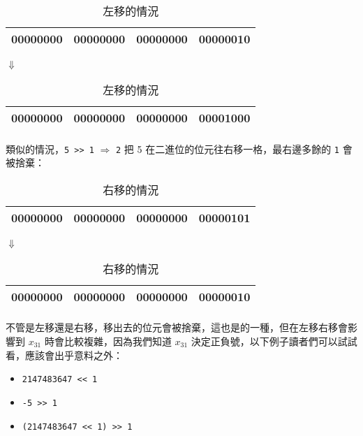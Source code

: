 \documentclass[12pt,a4paper,oneside]{report}
\begin{document}
\begin{CJK}{UTF8}{bkai}
\begin{table}[h!]
\centering
\begin{tabular}{|c|c|c|c|}
\hline
00000000 & 00000000 & 00000000 & 000000{\color{red}10}\\
\hline
\end{tabular}
\begin{center}$\Downarrow$\end{center}
\begin{tabular}{|c|c|c|c|}
\hline
00000000 & 00000000 & 00000000 & 0000{\color{red}10}00\\
\hline
\end{tabular}
\caption{左移的情況}
\label{basic:cpp:table:left:shift}
\end{table}

\paragraph{}類似的情況，\lstinline!5 >> 1!{ $\Rightarrow$ \lstinline!2!} 把 5 在二進位的位元往右移一格，最右邊多餘的 \lstinline!1! 會被捨棄：

\begin{table}[h!]
\centering
\begin{tabular}{|c|c|c|c|}
\hline
00000000 & 00000000 & 00000000 & 00000{\color{red}101}\\
\hline
\end{tabular}
\begin{center}$\Downarrow$\end{center}
\begin{tabular}{|c|c|c|c|}
\hline
00000000 & 00000000 & 00000000 & 000000{\color{red}10}\\
\hline
\end{tabular}
\caption{右移的情況}
\label{basic:cpp:table:right:shift}
\end{table}

\paragraph{}不管是左移還是右移，移出去的位元會被捨棄，這也是的一種，但在左移右移會影響到 $x_{31}$ 時會比較複雜，因為我們知道 $x_{31}$ 決定正負號，以下例子讀者們可以試試看，應該會出乎意料之外：
\begin{itemize}
\item \lstinline!2147483647 << 1!
\item \lstinline!-5 >> 1!
\item \lstinline!(2147483647 << 1) >> 1!
\end{itemize}


\end{CJK}
\end{document}
